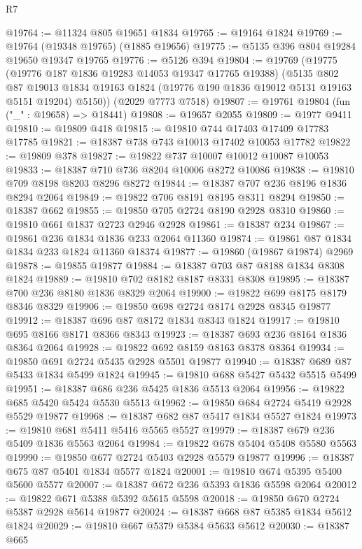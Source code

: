 \begin{lexlean}{R7}
\begin{coremodule}
@19764 := @11324 @805 @19651 @1834
@19765 := @19164 @1824
@19769 := @19764 (@19348 @19765) (@1885 @19656)
@19775 := @5135 @396 @804 @19284 @19650 @19347 @19765
@19776 := @5126 @394
@19804 := @19769
    (@19775
      (@19776 @187 @1836 @19283 @14053 @19347 @17765 @19388)
      (@5135
        @802
        @87
        @19013
        @1834
        @19163
        @1824
        (@19776 @190 @1836 @19012 @5131 @19163 @5151 @19204)
        @5150))
    (@2029 @7773 @7518)
@19807 := @19761 @19804 (fun ("_" : @19658) => @18441)
@19808 := @19657 @2055
@19809 := @1977 @9411
@19810 := @19809 @418
@19815 := @19810 @744 @17403 @17409 @17783 @17785
@19821 := @18387 @738 @743 @10013 @17402 @10053 @17782
@19822 := @19809 @378
@19827 := @19822 @737 @10007 @10012 @10087 @10053
@19833 := @18387 @710 @736 @8204 @10006 @8272 @10086
@19838 := @19810 @709 @8198 @8203 @8296 @8272
@19844 := @18387 @707 @236 @8196 @1836 @8294 @2064
@19849 := @19822 @706 @8191 @8195 @8311 @8294
@19850 := @18387 @662
@19855 := @19850 @705 @2724 @8190 @2928 @8310
@19860 := @19810 @661 @1837 @2723 @2946 @2928
@19861 := @18387 @234
@19867 := @19861 @236 @1834 @1836 @233 @2064 @11360
@19874 := @19861 @87 @1834 @1834 @233 @1824 @11360 @18374
@19877 := @19860 (@19867 @19874) @2969
@19878 := @19855 @19877
@19884 := @18387 @703 @87 @8188 @1834 @8308 @1824
@19889 := @19810 @702 @8182 @8187 @8331 @8308
@19895 := @18387 @700 @236 @8180 @1836 @8329 @2064
@19900 := @19822 @699 @8175 @8179 @8346 @8329
@19906 := @19850 @698 @2724 @8174 @2928 @8345 @19877
@19912 := @18387 @696 @87 @8172 @1834 @8343 @1824
@19917 := @19810 @695 @8166 @8171 @8366 @8343
@19923 := @18387 @693 @236 @8164 @1836 @8364 @2064
@19928 := @19822 @692 @8159 @8163 @8378 @8364
@19934 := @19850 @691 @2724 @5435 @2928 @5501 @19877
@19940 := @18387 @689 @87 @5433 @1834 @5499 @1824
@19945 := @19810 @688 @5427 @5432 @5515 @5499
@19951 := @18387 @686 @236 @5425 @1836 @5513 @2064
@19956 := @19822 @685 @5420 @5424 @5530 @5513
@19962 := @19850 @684 @2724 @5419 @2928 @5529 @19877
@19968 := @18387 @682 @87 @5417 @1834 @5527 @1824
@19973 := @19810 @681 @5411 @5416 @5565 @5527
@19979 := @18387 @679 @236 @5409 @1836 @5563 @2064
@19984 := @19822 @678 @5404 @5408 @5580 @5563
@19990 := @19850 @677 @2724 @5403 @2928 @5579 @19877
@19996 := @18387 @675 @87 @5401 @1834 @5577 @1824
@20001 := @19810 @674 @5395 @5400 @5600 @5577
@20007 := @18387 @672 @236 @5393 @1836 @5598 @2064
@20012 := @19822 @671 @5388 @5392 @5615 @5598
@20018 := @19850 @670 @2724 @5387 @2928 @5614 @19877
@20024 := @18387 @668 @87 @5385 @1834 @5612 @1824
@20029 := @19810 @667 @5379 @5384 @5633 @5612
@20030 := @18387 @665

\end{coremodule}
\end{lexlean}
